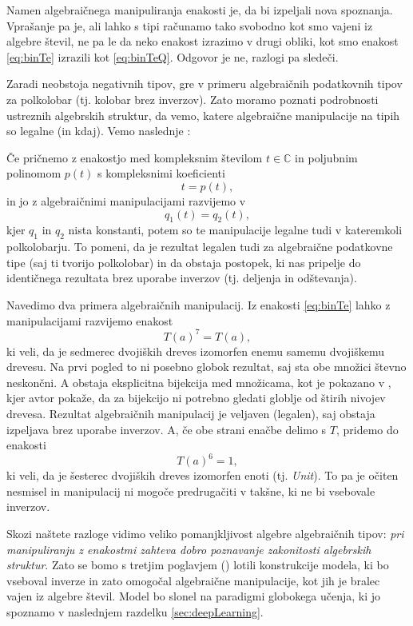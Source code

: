 \documentclass[a4paper, 12pt]{book}
\begin{document}
Namen algebraičnega manipuliranja enakosti je, da bi izpeljali nova spoznanja. Vprašanje pa je, ali lahko s tipi računamo tako svobodno kot smo vajeni iz algebre števil, ne pa le da neko enakost izrazimo v drugi obliki, kot smo enakost \eqref{eq:binTe} izrazili kot \eqref{eq:binTeQ}. Odgovor je ne, razlogi pa sledeči.

Zaradi neobstoja negativnih tipov, gre v primeru algebraičnih podatkovnih tipov za polkolobar (tj. kolobar brez inverzov). Zato moramo poznati podrobnosti ustreznih algebrskih struktur, da vemo, katere algebraične manipulacije na tipih so legalne (in kdaj). Vemo naslednje \cite{complexCat}: 

\noindent Če pričnemo z enakostjo med kompleksnim številom $t\in\mathbb{C}$ in poljubnim polinomom $p(t)$ s kompleksnimi koeficienti
$$t=p(t),$$
in jo z algebraičnimi manipulacijami razvijemo v
$$q_1(t)=q_2(t),$$
kjer $q_1$ in $q_2$ nista konstanti, potem so te manipulacije legalne tudi v kateremkoli polkolobarju. To pomeni, da je rezultat legalen tudi za algebraične podatkovne tipe (saj ti tvorijo polkolobar) in da obstaja postopek, ki nas pripelje do identičnega rezultata brez uporabe inverzov (tj. deljenja in odštevanja).

Navedimo dva primera algebraičnih manipulacij. Iz enakosti \eqref{eq:binTe} lahko z manipulacijami razvijemo enakost
$$T(a)^7=T(a),$$
ki veli, da je sedmerec dvojiških dreves izomorfen enemu samemu dvojiškemu drevesu. Na prvi pogled to ni posebno globok rezultat, saj sta obe množici števno neskončni. A obstaja eksplicitna bijekcija med množicama, kot je pokazano v \cite{7Trees}, kjer  avtor pokaže, da za bijekcijo ni potrebno gledati globlje od štirih nivojev drevesa. Rezultat algebraičnih manipulacij je veljaven (legalen), saj obstaja izpeljava brez uporabe inverzov.
A, če obe strani enačbe delimo s $T$, pridemo do enakosti
$$T(a)^6=1,$$
ki veli, da je šesterec dvojiških dreves izomorfen enoti (tj. \emph{Unit}). To pa je očiten nesmisel in manipulacij ni mogoče predrugačiti v takšne, ki ne bi vsebovale inverzov.

Skozi naštete razloge vidimo veliko pomanjkljivost algebre algebraičnih tipov: 
\emph{pri manipuliranju z enakostmi zahteva dobro poznavanje zakonitosti algebrskih struktur}. Zato se bomo s tretjim poglavjem () lotili konstrukcije modela, ki bo vseboval inverze in zato omogočal algebraične manipulacije, kot jih je bralec vajen iz algebre števil. Model bo slonel na paradigmi globokega učenja, ki jo spoznamo v naslednjem razdelku \ref{sec:deepLearning}.
\end{document}

